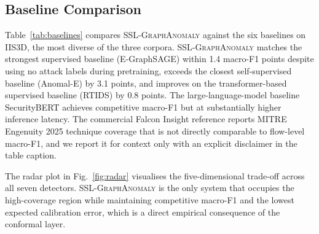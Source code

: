 \documentclass{ieeeaccess}
\begin{document}
\subsection{Baseline Comparison}
\label{sec:results:baselines}
Table~\ref{tab:baselines} compares \textsc{SSL-GraphAnomaly} against the
six baselines on IIS3D, the most diverse of the three corpora.
\textsc{SSL-GraphAnomaly} matches the strongest supervised baseline
(E-GraphSAGE) within 1.4 macro-F1 points despite using no attack labels
during pretraining, exceeds the closest self-supervised baseline
(Anomal-E) by 3.1 points, and improves on the transformer-based supervised
baseline (RTIDS) by 0.8 points. The large-language-model baseline
SecurityBERT achieves competitive macro-F1 but at substantially higher
inference latency. The commercial Falcon Insight reference reports MITRE
Engenuity 2025 technique coverage that is not directly comparable to
flow-level macro-F1, and we report it for context only with an explicit
disclaimer in the table caption.

The radar plot in Fig.~\ref{fig:radar} visualises the five-dimensional
trade-off across all seven detectors. \textsc{SSL-GraphAnomaly} is the
only system that occupies the high-coverage region while maintaining
competitive macro-F1 and the lowest expected calibration error, which is a
direct empirical consequence of the conformal layer.
\end{document}
